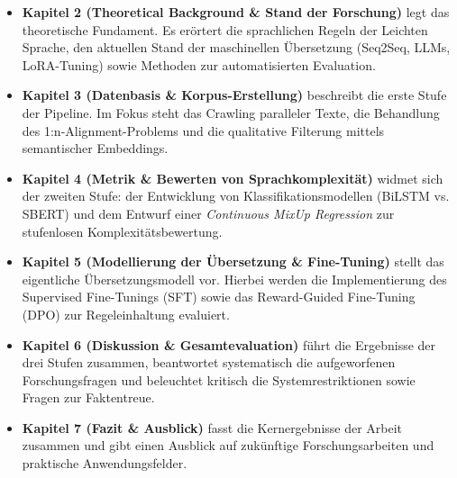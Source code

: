 \begin{itemize}
    \item \textbf{Kapitel 2 (Theoretical Background \& Stand der Forschung)} legt das theoretische Fundament. Es erörtert die sprachlichen Regeln der Leichten Sprache, den aktuellen Stand der maschinellen Übersetzung (Seq2Seq, LLMs, LoRA-Tuning) sowie Methoden zur automatisierten Evaluation.
    
    \item \textbf{Kapitel 3 (Datenbasis \& Korpus-Erstellung)} beschreibt die erste Stufe der Pipeline. Im Fokus steht das Crawling paralleler Texte, die Behandlung des 1:n-Alignment-Problems und die qualitative Filterung mittels semantischer Embeddings.
    
    \item \textbf{Kapitel 4 (Metrik \& Bewerten von Sprachkomplexität)} widmet sich der zweiten Stufe: der Entwicklung von Klassifikationsmodellen (BiLSTM vs. SBERT) und dem Entwurf einer \textit{Continuous MixUp Regression} zur stufenlosen Komplexitätsbewertung.
    
    \item \textbf{Kapitel 5 (Modellierung der Übersetzung \& Fine-Tuning)} stellt das eigentliche Übersetzungsmodell vor. Hierbei werden die Implementierung des Supervised Fine-Tunings (SFT) sowie das Reward-Guided Fine-Tuning (DPO) zur Regeleinhaltung evaluiert.
    
    \item \textbf{Kapitel 6 (Diskussion \& Gesamtevaluation)} führt die Ergebnisse der drei Stufen zusammen, beantwortet systematisch die aufgeworfenen Forschungsfragen und beleuchtet kritisch die Systemrestriktionen sowie Fragen zur Faktentreue.
    
    \item \textbf{Kapitel 7 (Fazit \& Ausblick)} fasst die Kernergebnisse der Arbeit zusammen und gibt einen Ausblick auf zukünftige Forschungsarbeiten und praktische Anwendungsfelder.
\end{itemize}
